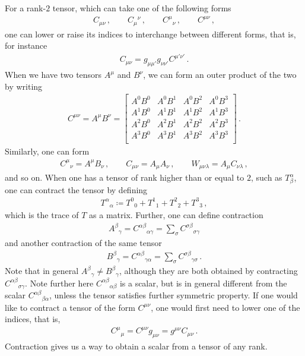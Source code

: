 \documentclass[11pt, onesided]{book}
\theoremstyle{break}
\theoremstyle{break}
\newcommand{\bmat}[1]{\begin{bmatrix} #1 \end{bmatrix}}
\begin{document}
For a rank-$2$ tensor, which can take one of the following forms
\begin{align*}
C_{\mu\nu}\,,\qquad
C_{\mu}{}^\nu\,,\qquad
C^\mu{}_{\nu}\,,\qquad
C^{\mu\nu}\,,
\end{align*}
one can lower or raise its indices to interchange between different forms, that is, for instance
\begin{align*}
C_{\mu\nu} = g_{\mu\mu'}g_{\nu\nu'}C^{\mu'\nu'}\,.
\end{align*}
When we have two tensors $A^\mu$ and $B^\nu$, we can form an outer product of the two by writing
\begin{align*}
C^{\mu\nu} = A^\mu B^\nu = \bmat{A^0B^0 & A^0 B^1 & A^0B^2 & A^0B^3\\
A^1B^0 & A^1 B^1 & A^1B^2 & A^1B^3\\
A^2B^0 & A^2 B^1 & A^2B^2 & A^2B^3\\
A^3B^0 & A^3 B^1 & A^3B^2 & A^3B^3\\}\,.
\end{align*}
Similarly, one can form 
\begin{align*}
C^\mu{}_\nu = A^\mu B_\nu\,,\qquad
C_{\mu\nu} = A_{\mu}A_\nu\,,\qquad
W_{\mu\nu \lambda} = A_\mu C_{\nu\lambda}\,,
\end{align*}
and so on. When one has a tensor of rank higher than or equal to $2$, such as $T^{\alpha}_{\beta}$, one can contract the tensor by defining
\begin{align*}
T^\alpha{}_\alpha \coloneqq 
T^0{}_0+T^1{}_1+T^2{}_2 + T^3{}_3\,,
\end{align*}
which is the trace of $T$ as a matrix. Further, one can define contraction
\begin{align*}
A^\beta{}_{\gamma} = C^{\alpha\beta}{}_{\alpha\gamma} = \sum_\sigma C^{\sigma\beta}{}_{\sigma\gamma}
\end{align*}
and another contraction of the same tensor
\begin{align*}
B^\beta{}_{\gamma} = C^{\alpha\beta}{}_{\gamma\alpha} = \sum_\sigma C^{\sigma\beta}{}_{\gamma\sigma}\,.
\end{align*}
Note that in general $A^\beta{}_{\gamma} \neq B^{\beta}{}_\gamma$,  although they are both obtained by contracting $C^{\alpha\beta}{}_{\sigma\gamma}$. Note further here
$C^{\alpha\beta}{}_{\alpha\beta}$ is a scalar, but is in general different from the scalar $C^{\alpha\beta}{}_{\beta \alpha}$, unless the tensor satisfies further symmetric property. If one would like to contract a tensor of the form $C^{\mu\nu}$, one would first need to lower one of the indices, that is, 
\begin{align*}
C^\mu{}_\mu = C^{\mu\nu}g_{\mu\nu} =g^{\mu\nu} C_{\mu\nu}\,. 
\end{align*}
Contraction gives us a way to obtain a scalar from a tensor of any rank. 
\end{document}
